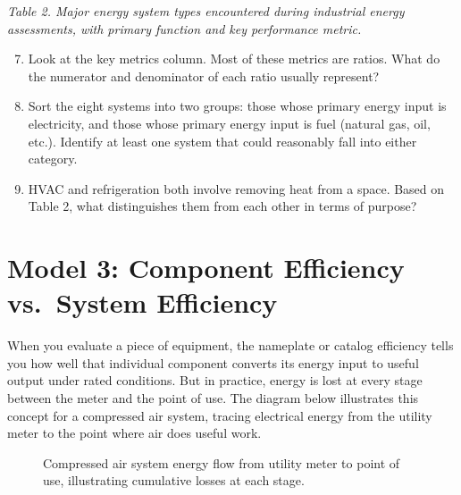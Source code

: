 \documentclass[./main.tex]{subfiles}
\begin{document}
\emph{Table 2. Major energy system types encountered during industrial energy
assessments, with primary function and key performance metric.}

\begin{enumerate}
  \setcounter{enumi}{6}
  \item Look at the key metrics column. Most of these metrics are ratios. What
        do the numerator and denominator of each ratio usually represent?
        \vspace{1.25in}

  \item Sort the eight systems into two groups: those whose primary energy
        input is electricity, and those whose primary energy input is fuel
        (natural gas, oil, etc.). Identify at least one system that could
        reasonably fall into either category.
        \vspace{1.25in}

  \item HVAC and refrigeration both involve removing heat from a space. Based
        on Table 2, what distinguishes them from each other in terms of
        purpose?
        \vspace{1.25in}

\end{enumerate}

\clearpage
\section*{Model 3: Component Efficiency vs.\ System Efficiency}

When you evaluate a piece of equipment, the nameplate or catalog efficiency
tells you how well that individual component converts its energy input to
useful output under rated conditions. But in practice, energy is lost at every
stage between the meter and the point of use. The diagram below illustrates
this concept for a compressed air system, tracing electrical energy from the
utility meter to the point where air does useful work.

\begin{figure}[ht]
  \centering
  \caption{Compressed air system energy flow from utility meter to point of
    use, illustrating cumulative losses at each stage.}
\end{figure}
\end{document}
